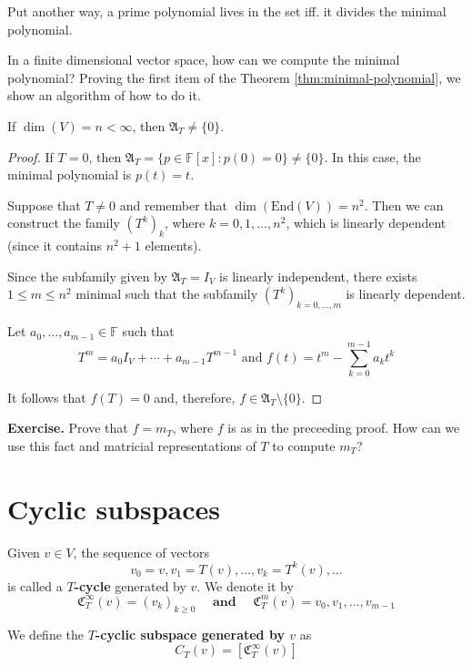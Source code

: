 Put another way, a prime polynomial lives in the set iff. it divides the minimal polynomial.

In a finite dimensional vector space, how can we compute the minimal polynomial? Proving the first item of the Theorem \ref{thm:minimal-polynomial}, we show an algorithm of how to do it.

\begin{theorem}
	If $\dim(V) = n < \infty$, then $\mathfrak{A}_T \neq \{ 0 \}$.
\end{theorem}

\begin{proof}
	If $T = 0$, then $\mathfrak{A}_T = \{ p \in \mathbb{F}[x] : p(0) = 0 \} \neq \{ 0 \}$. In this case, the minimal polynomial is $p(t) = t$.
	
	Suppose that $T \neq 0$ and remember that $\dim(\text{End}(V)) = n^2$. Then we can construct the family $(T^k)_k$, where $k = 0, 1, \ldots, n^2$, which is linearly dependent (since it contains $n^2 + 1$ elements).
	
	Since the subfamily given by $\mathfrak{A}_T = I_V$ is linearly independent, there exists $1 \leq m \leq n^2$ minimal such that the subfamily $(T^k)_{k=0, \ldots, m}$ is linearly dependent.
	
	Let $a_0, \ldots, a_{m-1} \in \mathbb{F}$ such that
	\[
		T^m = a_0 I_V + \cdots + a_{m-1} T^{m-1} \text{ and } f(t) = t^m - \sum_{k=0}^{m-1} a_k t^k
	\]
	
	It follows that $f(T) = 0$ and, therefore, $f \in \mathfrak{A}_T \setminus \{ 0 \}$.
\end{proof}

\textbf{Exercise.} Prove that $f = m_T$, where $f$ is as in the preceeding proof. How can we use this fact and matricial representations of $T$ to compute $m_T$?

\section{Cyclic subspaces}

\begin{definition}[$T$-cycle]
	Given $v \in V$, the sequence of vectors
	\[
		v_0 = v, v_1 = T(v), \ldots, v_k = T^k(v), \ldots
	\]
  is called a \textbf{$T$-cycle} generated by $v$. We denote it by \[ \mathfrak{C}_T^\infty (v) = (v_k)_{k \geq 0} \quad \textbf{ and } \quad \mathfrak{C}_T^m (v) = v_0, v_1, \ldots, v_{m-1} \]

	We define the \textbf{$T$-cyclic subspace generated by $v$} as
	\[
		C_T(v) = [\mathfrak{C}_T^\infty (v)]
	\]
\end{definition}

